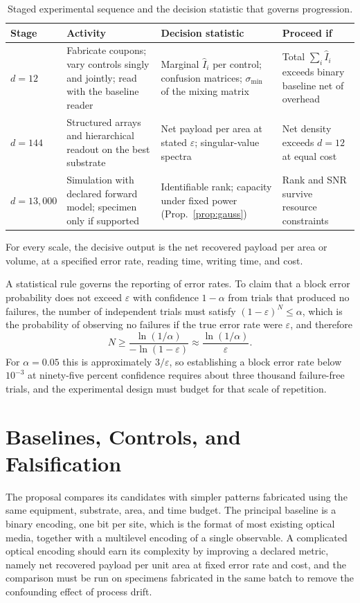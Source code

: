 \begin{table}[h]
\centering
\small
\begin{tabular}{@{}p{2.1cm}p{3.8cm}p{3.9cm}p{2.3cm}@{}}
\toprule
Stage & Activity & Decision statistic & Proceed if \\
\midrule
$d=12$ & Fabricate coupons; vary controls singly and jointly; read with the baseline reader & Marginal $\hat I_i$ per control; confusion matrices; $\sigma_{\min}$ of the mixing matrix & Total $\sum_i\hat I_i$ exceeds binary baseline net of overhead \\
$d=144$ & Structured arrays and hierarchical readout on the best substrate & Net payload per area at stated $\varepsilon$; singular-value spectra & Net density exceeds $d=12$ at equal cost \\
$d=13{,}000$ & Simulation with declared forward model; specimen only if supported & Identifiable rank; capacity under fixed power (Prop.~\ref{prop:gauss}) & Rank and SNR survive resource constraints \\
\bottomrule
\end{tabular}
\caption{Staged experimental sequence and the decision statistic that governs progression.}
\label{tab:stages}
\end{table}

For every scale, the decisive output is the net recovered payload per area or volume, at a specified error rate, reading time, writing time, and cost.

A statistical rule governs the reporting of error rates. To claim that a block error probability does not exceed $\varepsilon$ with confidence $1-\alpha$ from trials that produced no failures, the number of independent trials must satisfy $(1-\varepsilon)^{N}\le\alpha$, which is the probability of observing no failures if the true error rate were $\varepsilon$, and therefore
\[
N\ge\frac{\ln(1/\alpha)}{-\ln(1-\varepsilon)}\approx\frac{\ln(1/\alpha)}{\varepsilon}.
\]
For $\alpha=0.05$ this is approximately $3/\varepsilon$, so establishing a block error rate below $10^{-3}$ at ninety-five percent confidence requires about three thousand failure-free trials, and the experimental design must budget for that scale of repetition.

\section{Baselines, Controls, and Falsification}\label{sec:controls}

The proposal compares its candidates with simpler patterns fabricated using the same equipment, substrate, area, and time budget. The principal baseline is a binary encoding, one bit per site, which is the format of most existing optical media, together with a multilevel encoding of a single observable. A complicated optical encoding should earn its complexity by improving a declared metric, namely net recovered payload per unit area at fixed error rate and cost, and the comparison must be run on specimens fabricated in the same batch to remove the confounding effect of process drift.


